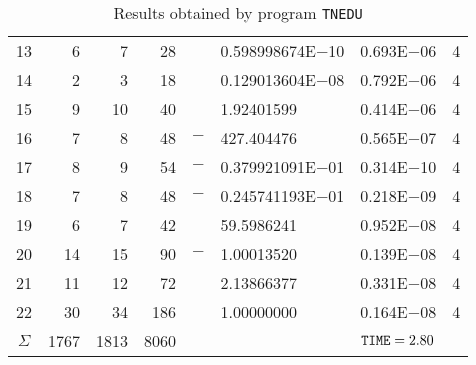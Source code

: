 \documentclass{esub2acm}
\begin{document}
\begin{table}
\begin{tabular}{c|rrrr@{}lcc}
13  &   6   &   7   &   28  &       &   0.598998674E$-$10   &   0.693E$-$06 &   4   \\
14  &   2   &   3   &   18  &       &   0.129013604E$-$08   &   0.792E$-$06 &   4   \\
15  &   9   &   10  &   40  &       &   1.92401599  &   0.414E$-$06 &   4   \\
16  &   7   &   8   &   48  &   $-$ &   427.404476  &   0.565E$-$07 &   4   \\
17  &   8   &   9   &   54  &   $-$ &   0.379921091E$-$01   &   0.314E$-$10 &   4   \\
18  &   7   &   8   &   48  &   $-$ &   0.245741193E$-$01   &   0.218E$-$09 &   4   \\
19  &   6   &   7   &   42  &       &   59.5986241  &   0.952E$-$08 &   4   \\
20  &   14  &   15  &   90  &   $-$ &   1.00013520  &   0.139E$-$08 &   4   \\
21  &   11  &   12  &   72  &       &   2.13866377  &   0.331E$-$08 &   4   \\
22  &   30  &   34  &   186 &       &   1.00000000  &   0.164E$-$08 &   4   \\ \hline
$\Sigma$\rule[-2pt]{0pt}{12pt}  &   1767    &   1813    &   8060    &       &       &   ${\tt TIME} = 2.80$ &       \\ \hline
\end{tabular}
\caption{Results obtained by program {\tt TNEDU}}
\label{tnedu}
\end{table}
\end{document}
